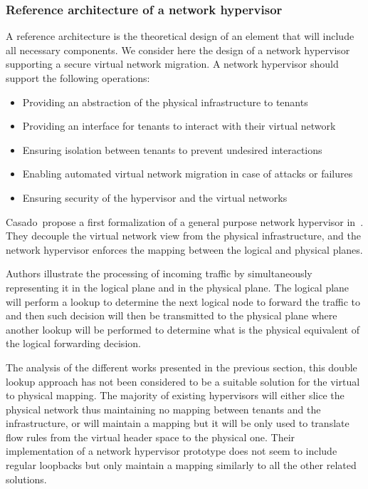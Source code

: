 \subsubsection{Reference architecture of a network hypervisor}
\label{sec:reference_archi}
A reference architecture is the theoretical design of an element that will include all necessary components. 
We consider here the design of a network hypervisor supporting a secure virtual network migration.
A network hypervisor should support the following operations:
\begin{itemize}
    \item Providing an abstraction of the physical infrastructure to tenants
    \item Providing an interface for tenants to interact with their virtual network
    \item Ensuring isolation between tenants to prevent undesired interactions 
    \item Enabling automated virtual network migration in case of attacks or failures
    \item Ensuring security of the hypervisor and the virtual networks
\end{itemize}

Casado~\etal propose a first formalization of a general purpose network hypervisor in~\cite{Netvirt_Definition-Casado2010}. They decouple the virtual network view from the physical infrastructure, and the network hypervisor enforces the mapping between the logical and physical planes.

Authors illustrate the processing of incoming traffic by simultaneously representing it in the logical plane and in the physical plane.
The logical plane will perform a lookup to determine the next logical node to forward the traffic to and then such decision will then be transmitted to the physical plane where another lookup will be performed to determine what is the physical equivalent of the logical forwarding decision.

The analysis of the different works presented in the previous section, this double lookup approach has not been considered to be a suitable solution for the virtual to physical mapping. The majority of existing hypervisors will either slice the physical network thus maintaining no mapping between tenants and the infrastructure, or will maintain a mapping but it will be only used to translate flow rules from the virtual header space to the physical one. Their implementation of a network hypervisor prototype does not seem to include regular loopbacks but only maintain a mapping similarly to all the other related solutions.

